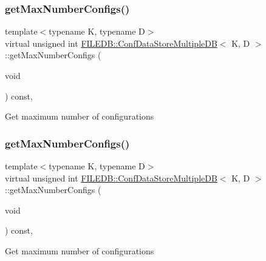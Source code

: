 \subsubsection{\texorpdfstring{getMaxNumberConfigs()}{getMaxNumberConfigs()}\hspace{0.1cm}{\footnotesize\ttfamily [1/3]}}
{\footnotesize\ttfamily template$<$typename K, typename D$>$ \\
virtual unsigned int \mbox{\hyperlink{classFILEDB_1_1ConfDataStoreMultipleDB}{F\+I\+L\+E\+D\+B\+::\+Conf\+Data\+Store\+Multiple\+DB}}$<$ K, D $>$\+::get\+Max\+Number\+Configs (\begin{DoxyParamCaption}\item[{void}]{ }\end{DoxyParamCaption}) const\hspace{0.3cm}{\ttfamily [inline]}, {\ttfamily [virtual]}}

Get maximum number of configurations \mbox{\label{classFILEDB_1_1ConfDataStoreMultipleDB_adb7a350dc85ad9c3830e98a0f03b68d7}} 
\subsubsection{\texorpdfstring{getMaxNumberConfigs()}{getMaxNumberConfigs()}\hspace{0.1cm}{\footnotesize\ttfamily [2/3]}}
{\footnotesize\ttfamily template$<$typename K, typename D$>$ \\
virtual unsigned int \mbox{\hyperlink{classFILEDB_1_1ConfDataStoreMultipleDB}{F\+I\+L\+E\+D\+B\+::\+Conf\+Data\+Store\+Multiple\+DB}}$<$ K, D $>$\+::get\+Max\+Number\+Configs (\begin{DoxyParamCaption}\item[{void}]{ }\end{DoxyParamCaption}) const\hspace{0.3cm}{\ttfamily [inline]}, {\ttfamily [virtual]}}

Get maximum number of configurations \mbox{\label{classFILEDB_1_1ConfDataStoreMultipleDB_adb7a350dc85ad9c3830e98a0f03b68d7}} 
